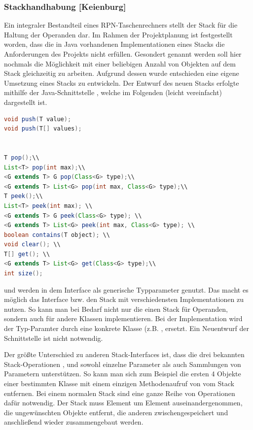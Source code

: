 \subsubsection{Stackhandhabung [Keienburg]}

Ein integraler Bestandteil eines RPN-Taschenrechners stellt der Stack für die Haltung der Operanden dar. Im Rahmen der Projektplanung ist festgestellt worden, dass die in Java vorhandenen Implementationen eines Stacks die Anforderungen des Projekts nicht erfüllen. Gesondert genannt werden soll hier nochmals die Möglichkeit mit einer beliebigen Anzahl von Objekten auf dem Stack gleichzeitig zu arbeiten. Aufgrund dessen wurde entschieden eine eigene Umsetzung eines Stacks zu entwickeln. Der Entwurf des neuen Stacks erfolgte mithilfe der Java-Schnittstelle , welche im Folgenden (leicht vereinfacht) dargestellt ist.

\begin{lstlisting}[caption=Stackinterface,label=list:stackinterface,language=Java]
void push(T value);
void push(T[] values);


T pop();\\
List<T> pop(int max);\\
<G extends T> G pop(Class<G> type);\\
<G extends T> List<G> pop(int max, Class<G> type);\\
T peek();\\
List<T> peek(int max); \\
<G extends T> G peek(Class<G> type); \\
<G extends T> List<G> peek(int max, Class<G> type); \\
boolean contains(T object); \\
void clear(); \\
T[] get(); \\
<G extends T> List<G> get(Class<G> type);\\
int size();
\end{lstlisting}

 und  werden in dem Interface als generische Typparameter genutzt. Das macht es möglich das Interface bzw. den Stack mit verschiedensten Implementationen zu nutzen. So kann man bei Bedarf nicht nur die einen Stack für Operanden, sondern auch für andere Klassen implementieren. Bei der Implementation wird der Typ-Paramter  durch eine konkrete Klasse (z.B. , ersetzt. Ein Neuentwurf der Schnittstelle ist nicht notwendig. 

Der größte Unterschied zu anderen Stack-Interfaces ist, dass die drei bekannten Stack-Operationen ,  und  sowohl einzelne Parameter als auch Sammlungen von Parametern unterstützen. So kann man sich zum Beispiel die ersten 4 Objekte einer bestimmten Klasse mit einem einzigen Methodenaufruf von  vom Stack entfernen. Bei einem normalen Stack sind eine ganze Reihe von Operationen dafür notwendig. Der Stack muss Element um Element auseinandergenommen, die ungewünschten Objekte entfernt, die anderen zwischengespeichert und anschließend wieder zusammengebaut werden.


